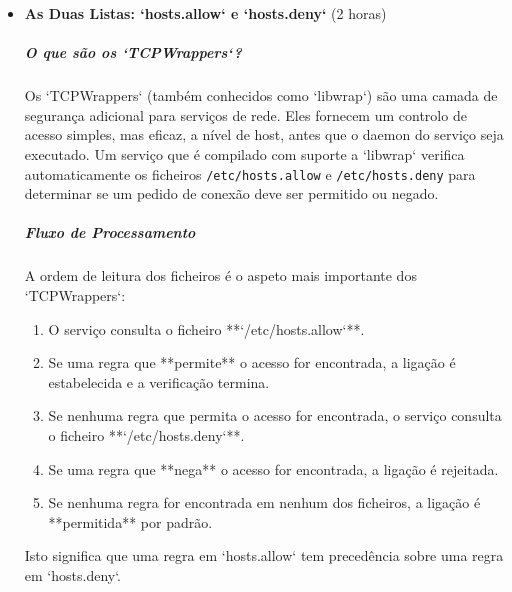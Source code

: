 \documentclass[10pt,a4paper]{article}
\begin{document}
	\begin{itemize}
		\item \textbf{As Duas Listas: `hosts.allow` e `hosts.deny`} (2 horas)
		\subparagraph{O que são os `TCPWrappers`?} Os `TCPWrappers` (também conhecidos como `libwrap`) são uma camada de segurança adicional para serviços de rede. Eles fornecem um controlo de acesso simples, mas eficaz, a nível de host, antes que o daemon do serviço seja executado. Um serviço que é compilado com suporte a `libwrap` verifica automaticamente os ficheiros \texttt{/etc/hosts.allow} e \texttt{/etc/hosts.deny} para determinar se um pedido de conexão deve ser permitido ou negado.
		
		\subparagraph{Fluxo de Processamento} A ordem de leitura dos ficheiros é o aspeto mais importante dos `TCPWrappers`:
		\begin{enumerate}
			\item O serviço consulta o ficheiro **`/etc/hosts.allow`**.
			\item Se uma regra que **permite** o acesso for encontrada, a ligação é estabelecida e a verificação termina.
			\item Se nenhuma regra que permita o acesso for encontrada, o serviço consulta o ficheiro **`/etc/hosts.deny`**.
			\item Se uma regra que **nega** o acesso for encontrada, a ligação é rejeitada.
			\item Se nenhuma regra for encontrada em nenhum dos ficheiros, a ligação é **permitida** por padrão.
		\end{enumerate}
		Isto significa que uma regra em `hosts.allow` tem precedência sobre uma regra em `hosts.deny`.
		

\end{itemize}
\end{document}
